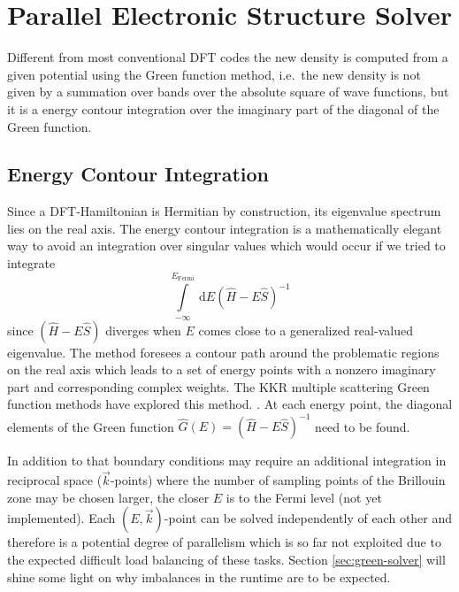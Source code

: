 \documentclass[oribibl]{llncs}
\newcommand{\um}[1]{_{\mathrm{#1}}}
\begin{document}
\newpage

\section{Parallel Electronic Structure Solver}
Different from most conventional \ac{DFT} codes
the new density is computed from a given potential using the Green function method,
i.e.~the new density is not given by a summation over bands over the absolute square of wave functions,
but it is a energy contour integration over the imaginary part of the diagonal of the Green function.

\subsection{Energy Contour Integration}
Since a \ac{DFT}-Hamiltonian is Hermitian by construction, its eigenvalue spectrum lies on the real axis.
The energy contour integration is a mathematically elegant way to avoid an integration over singular values
which would occur if we tried to integrate
\begin{equation}
	\int\limits_{-\infty}^{E\um{Fermi}} \ \mathrm d E (\hat H - E \hat S)^{-1}
\end{equation}
since $(\hat H - E \hat S)$ diverges when $E$ comes close to a generalized real-valued eigenvalue.
The method foresees a contour path around the problematic regions on the real axis
which leads to a set of energy points with a nonzero imaginary part and corresponding complex weights.
The KKR multiple scattering Green function methods have explored this method. 
.
At each energy point, the diagonal elements of the Green function $\hat G(E) = (\hat H - E \hat S)^{-1}$ need to be found.

\noindent
In addition to that boundary conditions may require an additional integration in reciprocal space ($\vec k$-points)
where the number of sampling points of the Brillouin zone may be chosen larger, the closer $E$ is to the Fermi level (not yet implemented).
Each $(E,\vec k)$-point can be solved independently of each other and therefore is a potential degree of parallelism which is so far not exploited due to the expected difficult load balancing of these tasks. Section \ref{sec:green-solver} will shine some light on why imbalances in the runtime are to be expected.
\end{document}
